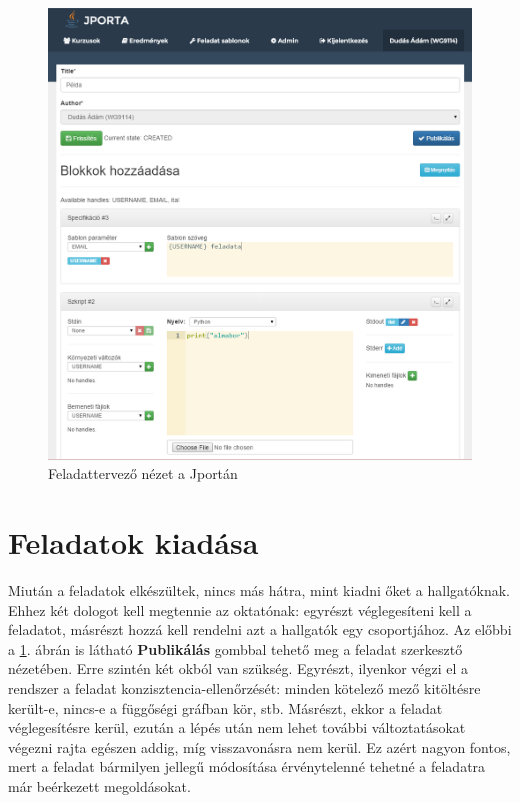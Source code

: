 \begin{figure}[h]
    \centering
    \includegraphics[width=\textwidth]{figures/jporta-exercise}
    \caption{Feladattervező nézet a Jportán}
    \label{figure:jporta-exercise}
\end{figure}

\section{Feladatok kiadása}
Miután a feladatok elkészültek, nincs más hátra, mint kiadni őket a hallgatóknak.
Ehhez két dologot kell megtennie az oktatónak: egyrészt véglegesíteni kell a feladatot, másrészt hozzá kell rendelni azt a hallgatók egy csoportjához.
Az előbbi a \ref{figure:jporta-exercise}. ábrán is látható \textbf{Publikálás} gombbal tehető meg a feladat szerkesztő nézetében.
Erre szintén két okból van szükség.
Egyrészt, ilyenkor végzi el a rendszer a feladat konzisztencia-ellenőrzését: minden kötelező mező kitöltésre került-e, nincs-e a függőségi gráfban kör, stb.
Másrészt, ekkor a feladat véglegesítésre kerül, ezután a lépés után nem lehet további változtatásokat végezni rajta egészen addig, míg visszavonásra nem kerül.
Ez azért nagyon fontos, mert a feladat bármilyen jellegű módosítása érvénytelenné tehetné a feladatra már beérkezett megoldásokat.

